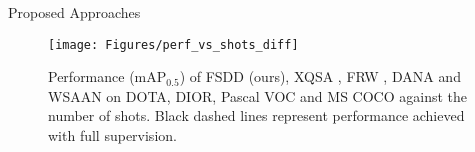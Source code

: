 \begin{subsectionframemod}{Proposed Approaches}

    \begin{figure}
        \texttt{[image: Figures/perf\_vs\_shots\_diff]}
        \caption{Performance (mAP$_{0.5}$) of
        FSDD (ours), XQSA \cite{lejeune2023xqsa}, FRW \cite{kang2019few}, DANA \cite{chen2021should} and WSAAN \cite{xiao2020fsod} on DOTA, DIOR, Pascal VOC and MS
        COCO against the number of shots. Black dashed lines represent performance achieved with full supervision.}\label{fig:diff_perf_vs_shot}
    \end{figure}
     
\end{subsectionframemod}
